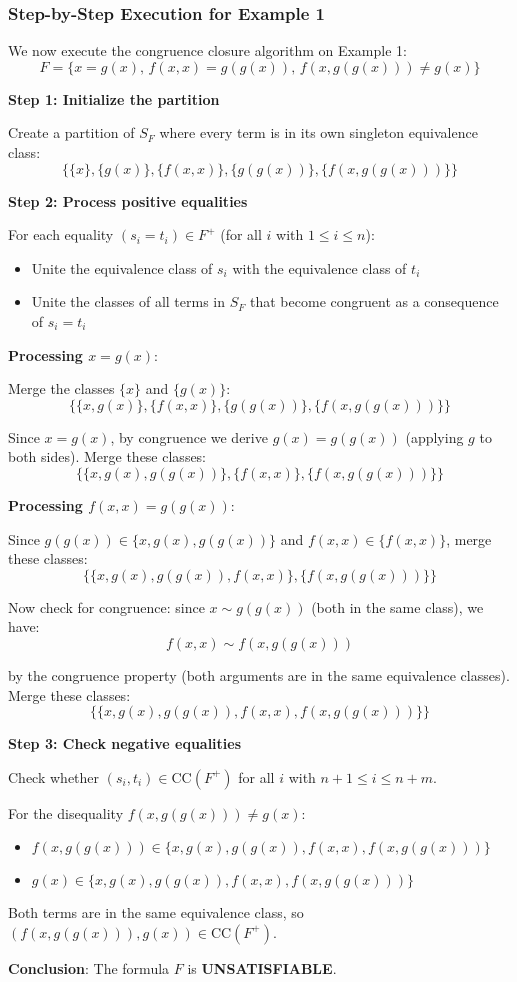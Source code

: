 \documentclass[11pt,a4paper]{article}
\theoremstyle{definition}
\theoremstyle{plain}
\theoremstyle{remark}
\begin{document}
\subsubsection{Step-by-Step Execution for Example 1}

We now execute the congruence closure algorithm on Example 1:
\[
F = \{x = g(x), \, f(x, x) = g(g(x)), \, f(x, g(g(x))) \neq g(x)\}
\]

\textbf{Step 1: Initialize the partition}

Create a partition of $S_F$ where every term is in its own singleton equivalence class:
\[
\{\{x\}, \{g(x)\}, \{f(x, x)\}, \{g(g(x))\}, \{f(x, g(g(x)))\}\}
\]

\textbf{Step 2: Process positive equalities}

For each equality $(s_i = t_i) \in F^+$ (for all $i$ with $1 \leq i \leq n$):
\begin{itemize}
    \item Unite the equivalence class of $s_i$ with the equivalence class of $t_i$
    \item Unite the classes of all terms in $S_F$ that become congruent as a consequence of $s_i = t_i$
\end{itemize}

\textbf{Processing $x = g(x)$}:

Merge the classes $\{x\}$ and $\{g(x)\}$:
\[
\{\{x, g(x)\}, \{f(x, x)\}, \{g(g(x))\}, \{f(x, g(g(x)))\}\}
\]

Since $x = g(x)$, by congruence we derive $g(x) = g(g(x))$ (applying $g$ to both sides). Merge these classes:
\[
\{\{x, g(x), g(g(x))\}, \{f(x, x)\}, \{f(x, g(g(x)))\}\}
\]

\textbf{Processing $f(x, x) = g(g(x))$}:

Since $g(g(x)) \in \{x, g(x), g(g(x))\}$ and $f(x, x) \in \{f(x, x)\}$, merge these classes:
\[
\{\{x, g(x), g(g(x)), f(x, x)\}, \{f(x, g(g(x)))\}\}
\]

Now check for congruence: since $x \sim g(g(x))$ (both in the same class), we have:
\[
f(x, x) \sim f(x, g(g(x)))
\]

by the congruence property (both arguments are in the same equivalence classes). Merge these classes:
\[
\{\{x, g(x), g(g(x)), f(x, x), f(x, g(g(x)))\}\}
\]

\textbf{Step 3: Check negative equalities}

Check whether $(s_i, t_i) \in \text{CC}(F^+)$ for all $i$ with $n+1 \leq i \leq n+m$.

For the disequality $f(x, g(g(x))) \neq g(x)$:
\begin{itemize}
    \item $f(x, g(g(x))) \in \{x, g(x), g(g(x)), f(x, x), f(x, g(g(x)))\}$
    \item $g(x) \in \{x, g(x), g(g(x)), f(x, x), f(x, g(g(x)))\}$
\end{itemize}

Both terms are in the same equivalence class, so $(f(x, g(g(x))), g(x)) \in \text{CC}(F^+)$.

\textbf{Conclusion}: The formula $F$ is \textbf{UNSATISFIABLE}.
\end{document}
